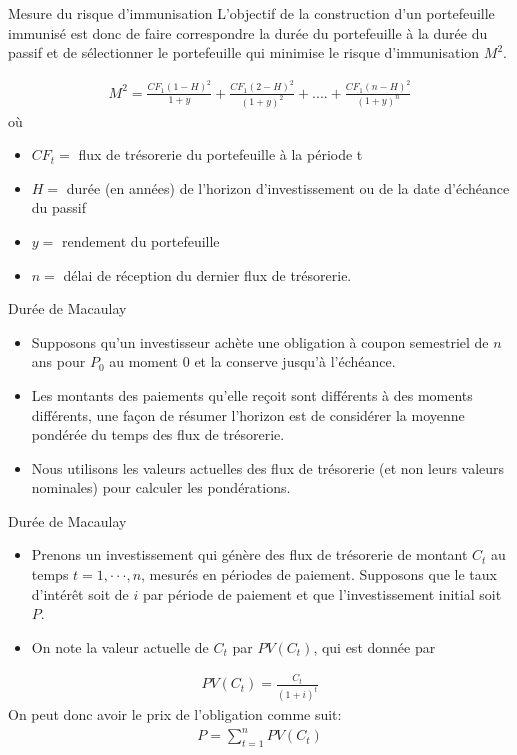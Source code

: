 \documentclass[10pt,a4paper]{beamer}
\begin{document}
\begin{frame}{Mesure du risque d'immunisation}
L'objectif de la construction d'un portefeuille immunisé est donc de faire correspondre la durée du portefeuille à la durée du passif et de sélectionner le portefeuille qui minimise le risque d'immunisation $M^2$.

\begin{align*}
M^2=\frac{CF_1 (1-H)^2}{1+y}+\frac{CF_1 (2-H)^2}{(1+y)^2}+....+\frac{CF_1 (n-H)^2}{(1+y)^n}
\end{align*}
où 
\begin{itemize}[label=\bullet]
\item $CF_t =$ flux de trésorerie du portefeuille à la période t
\item $H =$ durée (en années) de l'horizon d'investissement ou de la date d'échéance du passif
\item $y =$ rendement du portefeuille 
\item $n =$ délai de réception du dernier flux de trésorerie.
\end{itemize}
\end{frame}

\begin{frame}{Durée de Macaulay}
\begin{itemize}[label=\bullet]
\item Supposons qu'un investisseur achète une obligation à coupon semestriel de $n$ ans pour $P_0$ au moment $0$ et la conserve jusqu'à l'échéance.
\item Les montants des paiements qu'elle reçoit sont différents à des moments différents, une façon de résumer l'horizon est de considérer la moyenne pondérée du temps des flux de trésorerie.
\item Nous utilisons les valeurs actuelles des flux de trésorerie (et non leurs valeurs nominales) pour calculer les pondérations.
\end{itemize}
\end{frame}


\begin{frame}{Durée de Macaulay}
\begin{itemize}[label=\bullet]
\item Prenons un investissement qui génère des flux de trésorerie de montant $C_t$ au temps $t = 1, · · ·, n$,  mesurés en périodes de paiement. Supposons que le taux d'intérêt soit de $i$ par période de paiement et que l'investissement initial soit $P$.
\item On note la valeur actuelle de $C_t$ par $PV(C_t)$, qui est donnée par
\end{itemize}
\begin{align*}
PV(C_t)=\frac{C_t}{(1+i)^t}
\end{align*}
On peut donc avoir le prix de l'obligation comme suit:
\begin{align*}
P=\sum_{t=1}^n PV(C_t)
\end{align*}
\end{frame}
\end{document}
